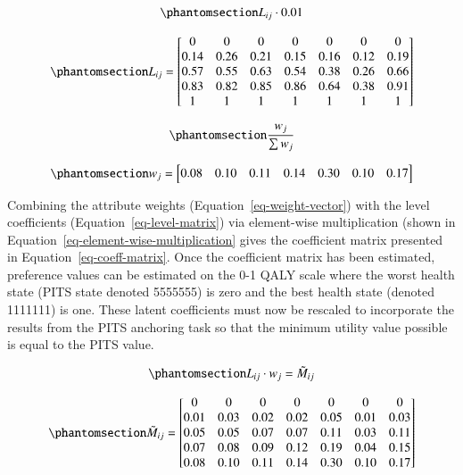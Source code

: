 \documentclass[
  number,
  preprint]{elsarticle}
\begin{document}
\begin{equation}\phantomsection\label{eq-level-rescale}{
    L_{ij} \cdot 0.01
}\end{equation}

\begin{equation}\phantomsection\label{eq-level-matrix}{
L_{ij} = 
\begin{bmatrix}
0 & 0 & 0 & 0 & 0 & 0 & 0 \\
0.14 & 0.26 & 0.21 & 0.15 & 0.16 & 0.12 & 0.19 \\
0.57 & 0.55 & 0.63 & 0.54 & 0.38 & 0.26 & 0.66 \\
0.83 & 0.82 & 0.85 & 0.86 & 0.64 & 0.38 & 0.91 \\
1 & 1 & 1 & 1 & 1 & 1 & 1 \\
\end{bmatrix}
}\end{equation}

\begin{equation}\phantomsection\label{eq-weight-normalise}{
    \frac{w_{j}}{\sum{w_j}}
}\end{equation}

\begin{equation}\phantomsection\label{eq-weight-vector}{
w_j = \begin{bmatrix}
    0.08& 0.10& 0.11& 0.14& 0.30& 0.10& 0.17
\end{bmatrix} 
}\end{equation}

Combining the attribute weights (Equation~\ref{eq-weight-vector}) with
the level coefficients (Equation~\ref{eq-level-matrix}) via element-wise
multiplication (shown in Equation~\ref{eq-element-wise-multiplication}
gives the coefficient matrix presented in
Equation~\ref{eq-coeff-matrix}. Once the coefficient matrix has been
estimated, preference values can be estimated on the 0-1 QALY scale
where the worst health state (PITS state denoted 5555555) is zero and
the best health state (denoted 1111111) is one. These latent
coefficients must now be rescaled to incorporate the results from the
PITS anchoring task so that the minimum utility value possible is equal
to the PITS value.

\begin{equation}\phantomsection\label{eq-element-wise-multiplication}{
    L_{ij} \cdot  w_{j} = {\tilde{M}}_{ij}
}\end{equation}

\begin{equation}\phantomsection\label{eq-coeff-matrix}{
\tilde{M}_{ij} =  
\begin{bmatrix}
0 & 0 & 0 & 0 & 0 & 0 & 0 \\
0.01 & 0.03 & 0.02 & 0.02 & 0.05 & 0.01 & 0.03 \\
0.05 & 0.05 & 0.07 & 0.07 & 0.11 & 0.03 & 0.11 \\
0.07 & 0.08 & 0.09 & 0.12 & 0.19 & 0.04 & 0.15 \\
0.08 & 0.10 & 0.11 & 0.14 & 0.30 & 0.10 & 0.17
\end{bmatrix}
}\end{equation}
\end{document}
